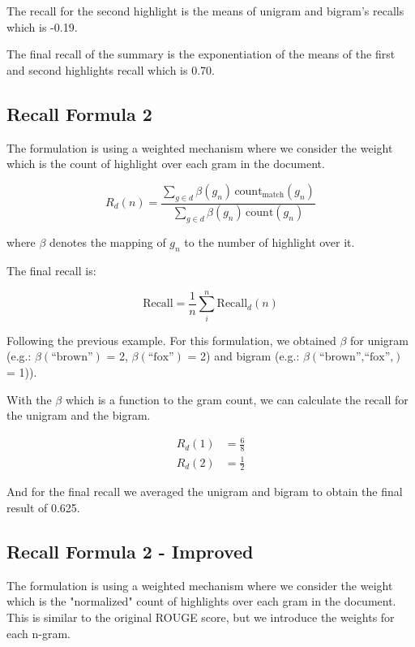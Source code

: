 \documentclass[11pt,a4paper]{article}
\begin{document}
The recall for the second highlight is the means of unigram and bigram's recalls which is -0.19. 

The final recall of the summary is the exponentiation of the means of the first and second highlights recall which is 0.70.


\subsection{Recall Formula 2}

The formulation is using a weighted mechanism where we consider the weight which is the count of highlight over each gram in the document. 

\begin{equation}
    R_d(n) = \frac{\displaystyle\sum_{g \in d} \beta(g_n)\, \text{count}_{\text{match}}(g_n)}{\displaystyle\sum_{g \in d} \beta(g_n)\,\text{count}(g_n)}
\end{equation}

where $\beta$ denotes the mapping of $g_n$ to the number of highlight over it.

The final recall is:

\begin{equation}
    \text{Recall} = \frac{1}{n}\displaystyle\sum_{i}^{n} \text{Recall}_d(n)
\end{equation}

Following the previous example. For this formulation, we obtained $\beta$ for unigram (e.g.: $\beta(\text{``brown''})$ = 2, $\beta(\text{``fox''})$ = 2) and bigram (e.g.: $\beta(\text{``brown'',``fox'',})$ = 1)).

With the $\beta$ which is a function to the gram count, we can calculate the recall for the unigram and the bigram.

\begin{equation}
    \begin{split}
        R_d(1) &= \frac{6}{8} \\
        R_d(2) &= \frac{1}{2}
    \end{split}
\end{equation}

And for the final recall we averaged the unigram and bigram to obtain the final result of 0.625.

\subsection{Recall Formula 2 - Improved}

The formulation is using a weighted mechanism where we consider the weight which is the "normalized" count of highlights over each gram in the document. This is similar to the original ROUGE score, but we introduce the weights for each n-gram. 
\end{document}
